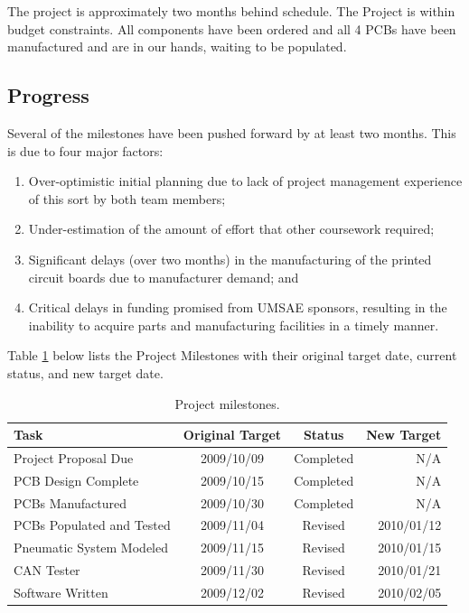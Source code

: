 \documentclass[12pt]{report}
\begin{document}
  The project is approximately two months behind schedule. The Project is within budget constraints. All components have been ordered and all 4 PCBs have been manufactured and are in our hands, waiting to be populated.

  \subsection{Progress}

  Several of the milestones have been pushed forward by at least two months. This is due to four major factors:
  \begin{enumerate}
  \item Over-optimistic initial planning due to lack of project management experience of this sort by both team members;
  \item Under-estimation of the amount of effort that other coursework required;
  \item Significant delays (over two months) in the manufacturing of the printed circuit boards due to manufacturer demand; and
  \item Critical delays in funding promised from UMSAE sponsors, resulting in the inability to acquire parts and manufacturing facilities in a timely manner.
  \end{enumerate}

  Table \ref{table:milestones} below lists the Project Milestones with their original target date, current status, and new target date.

  \begin{table}[H]
    \caption{Project milestones.}
    \label{table:milestones}
    \centering
    \begin{tabular}{|l|c|c|r|}
      \hline
      Task & Original Target & Status & New Target\\
      \hline
      Project Proposal Due & 2009/10/09 & Completed & N/A \\
      PCB Design Complete & 2009/10/15 & Completed & N/A  \\
      PCBs Manufactured & 2009/10/30 & Completed & N/A \\
      PCBs Populated and Tested & 2009/11/04 & Revised & 2010/01/12 \\
      Pneumatic System Modeled & 2009/11/15 & Revised & 2010/01/15 \\
      CAN Tester & 2009/11/30 & Revised & 2010/01/21 \\
      Software Written & 2009/12/02 & Revised & 2010/02/05 \\
      \hline
    \end{tabular}
  \end{table}
\end{document}
